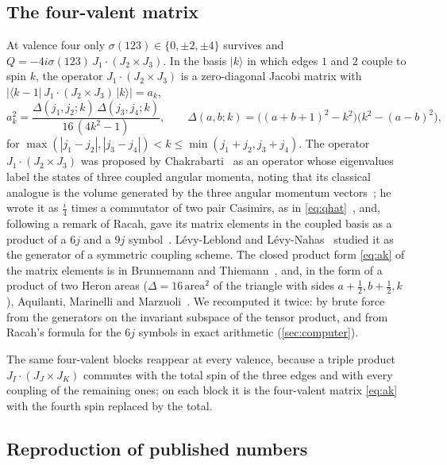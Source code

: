 \subsection{The four-valent matrix}

At valence four only $\sigma(123)\in\{0,\pm2,\pm4\}$ survives and
$Q=-4i\sigma(123)\,J_1\cdot(J_2\times J_3)$. In the basis $|k\rangle$ in which edges
$1$ and $2$ couple to spin $k$, the operator $J_1\cdot(J_2\times J_3)$ is a
zero-diagonal Jacobi matrix with $|\langle k-1|\,J_1\cdot(J_2\times J_3)\,|k\rangle|=a_k$,
\begin{equation}\label{eq:ak}
  a_k^2=\frac{\Delta(j_1,j_2;k)\,\Delta(j_3,j_4;k)}{16\,(4k^2-1)},\qquad
  \Delta(a,b;k)=\bigl((a+b+1)^2-k^2\bigr)\bigl(k^2-(a-b)^2\bigr),
\end{equation}
for $\max(|j_1-j_2|,|j_3-j_4|)<k\le\min(j_1+j_2,j_3+j_4)$. The operator
$J_1\cdot(J_2\times J_3)$ was proposed by Chakrabarti~\cite{Chakrabarti1964} as an operator
whose eigenvalues label the states of three coupled angular momenta, noting that its classical
analogue is the volume generated by the three angular momentum vectors~\cite[p.~302]{Chakrabarti1964}; he wrote it as $\frac i4$
times a commutator of two pair Casimirs, as in \eqref{eq:qhat}~\cite[eq.~(2.4)]{Chakrabarti1964},
and, following a remark of Racah, gave its matrix elements in the coupled basis as a
product of a $6j$ and a $9j$ symbol~\cite[p.~327]{Chakrabarti1964}. L\'evy-Leblond and
L\'evy-Nahas~\cite{LLLN1965} studied it as the generator of a symmetric coupling scheme.
The closed product form \eqref{eq:ak} of the matrix elements is in Brunnemann and
Thiemann~\cite[eq.~(67)]{BT2006}, and, in the form of
a product of two Heron areas
($\Delta=16\,\mathrm{area}^2$ of the triangle with sides $a+\frac12,b+\frac12,k$),
Aquilanti, Marinelli and Marzuoli~\cite[eq.~(2)]{AMM2013}. We recomputed it twice:
by brute force from the generators on the invariant subspace of the tensor product,
and from Racah's formula for the $6j$ symbols in exact arithmetic
(\cref{sec:computer}).

The same four-valent blocks reappear at every valence, because a triple product
$J_I\cdot(J_J\times J_K)$ commutes with the total spin of the three edges and with
every coupling of the remaining ones; on each block it is the four-valent matrix
\eqref{eq:ak} with the fourth spin replaced by the total.

\subsection{Reproduction of published numbers}

